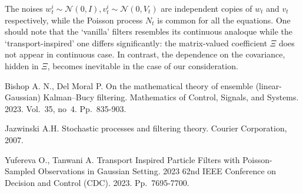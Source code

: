 \documentclass[12pt]{llncs}
\begin{document}
The noises
$w^i_t\sim \mathcal{N}(0,I), v^i_t\sim \mathcal{N}(0,V_t)$ are independent copies of $w_t$ and $v_t$ respectively, while the Poisson process $N_t$ is common for all the equations.
One should note that the `vanilla' filters resembles its continuous analoque while the `transport-inspired' one differs significantly: the matrix-valued coefficient $\Xi$ does not appear in continuous case. In contrast, the dependence on the covariance, hidden in  $\Xi$, becomes inevitable in the case of our consideration.


\begin{thebibliography}{9} %

 Bishop A. N., Del Moral P. On the mathematical theory of ensemble (linear-Gaussian) Kalman–Bucy filtering. Mathematics of Control, Signals, and Systems. 2023. Vol.~35, no~4. Pp.~835-903.

 Jazwinski A.H. Stochastic processes and filtering theory. Courier Corporation, 2007.

 Yufereva O., Tanwani A. Transport Inspired Particle Filters with Poisson-Sampled Observations in Gaussian Setting. 2023 62nd IEEE Conference on Decision and Control (CDC). 2023. Pp.~7695-7700.

\end{thebibliography}
\end{document}
